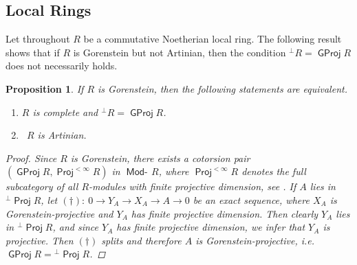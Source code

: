 \documentclass[oneside, a4paper,reqno]{amsart}
\numberwithin{equation}{section}
\newtheorem{prop}[thm]{Proposition}
\theoremstyle{definition}
\begin{document}
\subsection{Local Rings} Let throughout $R$ be a commutative Noetherian local ring.
 The following result shows that if $R$ is Gorenstein but not Artinian,
 then the condition ${^{\pmb{\bot}}}R = {\operatorname{\mathsf{GProj}}\nolimits} R$ does not necessarily holds.

\begin{prop} If $R$ is Gorenstein, then the  following statements are equivalent.
\begin{enumerate}
\item $R$ is complete and  ${^{\pmb{\bot}}}R = {\operatorname{\mathsf{GProj}}\nolimits} R$.
\item \ $R$ is Artinian.
\end{enumerate}
\begin{proof} Since $R$ is Gorenstein, there exists a
cotorsion pair $({\operatorname{\mathsf{GProj}}\nolimits} R,\operatorname*{\mathsf{Proj}}^{<\infty}R)$ in $\operatorname*{\mathsf{Mod}-\!} R$, where
$\operatorname*{\mathsf{Proj}}^{<\infty}R$ denotes the full subcategory of all $R$-modules
with finite projective dimension, see \cite{B:gorenstein, EJ}. If
$A$ lies in ${^{\bot}}\operatorname*{\mathsf{Proj}} R$, let $(\dag): \ 0 {\longrightarrow} Y_{A} {\longrightarrow}
X_{A} {\longrightarrow} A {\longrightarrow} 0$ be an exact sequence, where $X_{A}$ is
Gorenstein-projective and $Y_{A}$ has finite projective dimension.
Then clearly $Y_{A}$ lies in ${^{\bot}}\operatorname*{\mathsf{Proj}} R$, and since $Y_{A}$
has finite projective dimension, we infer that $Y_{A}$ is
projective. Then $(\dag)$ splits and therefore $A$ is
Gorenstein-projective, i.e. ${\operatorname{\mathsf{GProj}}\nolimits} R = {^{\bot}}\operatorname*{\mathsf{Proj}} R$.


\end{proof}
\end{prop}
\end{document}

